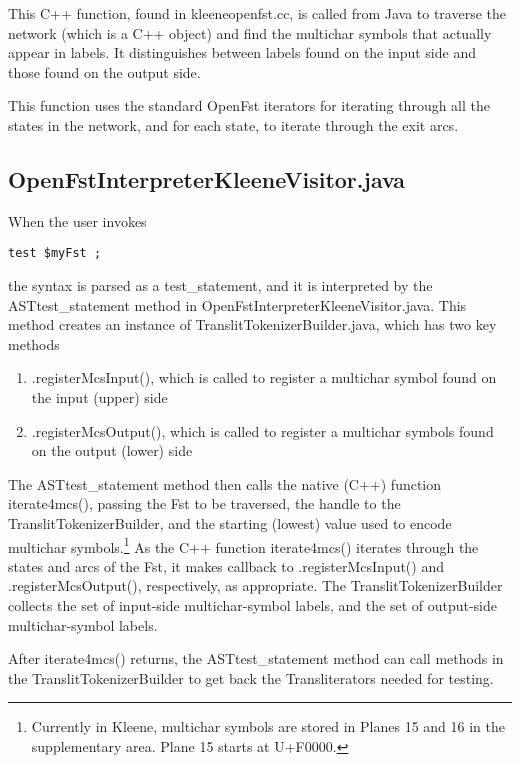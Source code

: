 \documentclass[letterpaper,12pt]{article}
\begin{document}
This C++ function, found in kleeneopenfst.cc, is called from Java to
traverse the network (which is a C++ object) and find the multichar
symbols that actually appear in labels.  It distinguishes between labels
found on the input side and those found on the output side.

This function uses the standard OpenFst iterators for iterating through
all the states in the network, and for each state, to iterate through the
exit arcs.

\subsection{OpenFstInterpreterKleeneVisitor.java}

When the user invokes

\begin{Verbatim}[fontsize=\small]
test $myFst ;
\end{Verbatim}

\noindent
the syntax is parsed as a test\_statement, and it is interpreted by the
ASTtest\_statement method in OpenFstInterpreterKleeneVisitor.java.  This
method creates an instance of TranslitTokenizerBuilder.java, which has two key methods

\begin{enumerate}
\item
.registerMcsInput(), which is called to register a multichar symbol found
on the input (upper) side
\item
.registerMcsOutput(), which is called to register a multichar symbols found
on the output (lower) side
\end{enumerate}

The ASTtest\_statement method then calls the native (C++) function
iterate4mcs(), passing the Fst to be traversed, the handle to the
TranslitTokenizerBuilder, and the starting (lowest) value used to encode
multichar symbols.\footnote{Currently in Kleene, multichar symbols are stored in
Planes 15 and 16 in the supplementary area.  Plane 15 starts at U+F0000.}
As the C++ function iterate4mcs() iterates through the states and arcs of
the Fst, it makes callback to .registerMcsInput() and .registerMcsOutput(),
respectively, as appropriate.  The TranslitTokenizerBuilder collects the set
of input-side multichar-symbol labels, and the set of output-side multichar-symbol
labels.

After iterate4mcs() returns, the ASTtest\_statement method can call methods
in the TranslitTokenizerBuilder to get back the Transliterators needed for
testing.  
\end{document}
